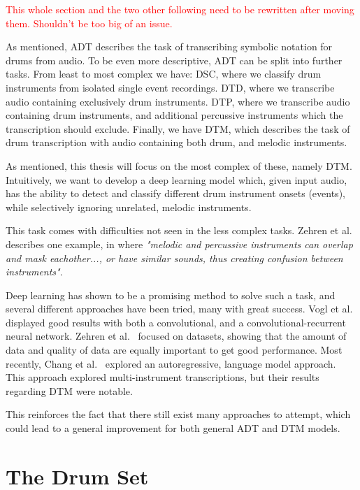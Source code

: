\textcolor{red}{This whole section and the two other following need to be rewritten after moving them. Shouldn't be too big of an issue.}

As mentioned, \gls{ADT} describes the task of transcribing symbolic notation for drums from audio. To be even more descriptive, \gls{ADT} can be split into further tasks. From least to most complex we have: \gls{DSC}, where we classify drum instruments from isolated single event recordings. \gls{DTD}, where we transcribe audio containing exclusively drum instruments. \gls{DTP}, where we transcribe audio containing drum instruments, and additional percussive instruments which the transcription should exclude. Finally, we have \gls{DTM}, which describes the task of drum transcription with audio containing both drum, and melodic instruments.~\cite{8350302}

As mentioned, this thesis will focus on the most complex of these, namely \gls{DTM}. Intuitively, we want to develop a deep learning model which, given input audio, has the ability to detect and classify different drum instrument onsets (events), while selectively ignoring unrelated, melodic instruments.

This task comes with difficulties not seen in the less complex tasks. Zehren et al.~\cite{signals4040042} describes one example, in where \textit{"melodic and percussive instruments can overlap and mask eachother..., or have similar sounds, thus creating confusion between instruments"}.

Deep learning has shown to be a promising method to solve such a task, and several different approaches have been tried, many with great success. Vogl et al.~\cite{vogl2018multiinstrumentdrumtranscription, Vogl2017DrumTV} displayed good results with both a convolutional, and a convolutional-recurrent neural network. Zehren et al.~\cite{signals4040042, zehren2024analyzingreducingsynthetictorealtransfer} focused on datasets, showing that the amount of data and quality of data are equally important to get good performance. Most recently, Chang et al.~\cite{chang2024yourmt3+} explored an autoregressive, language model approach. This approach explored multi-instrument transcriptions, but their results regarding \gls{DTM} were notable.

This reinforces the fact that there still exist many approaches to attempt, which could lead to a general improvement for both general \gls{ADT} and \gls{DTM} models.

\section{The Drum Set}

